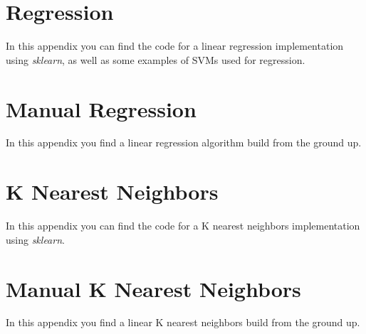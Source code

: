 \chapter{Regression}\label{code:regression}
In this appendix you can find the code for a linear regression implementation using \emph{sklearn}, as well as some examples of SVMs used for regression.\\


\chapter{Manual Regression}\label{code:manualregression}
In this appendix you find a linear regression algorithm build from the ground up.\\


\chapter{K Nearest Neighbors}\label{code:knn}
In this appendix you can find the code for a K nearest neighbors implementation using \emph{sklearn}.\\


\chapter{Manual K Nearest Neighbors}\label{code:mknn}
In this appendix you find a linear K nearest neighbors build from the ground up.\\




